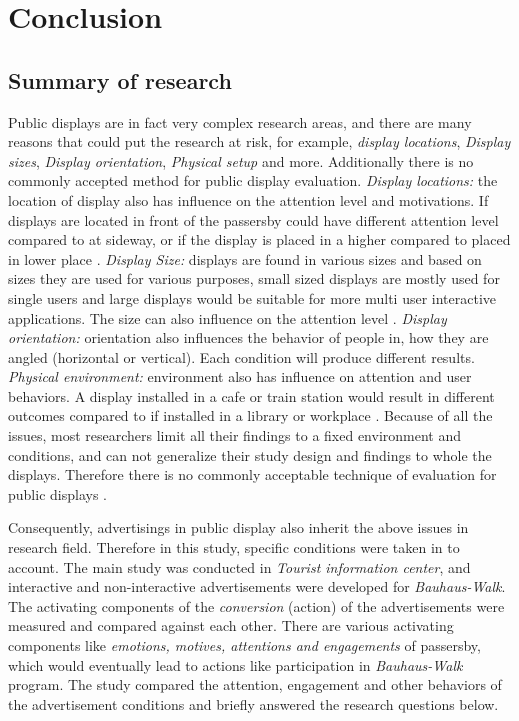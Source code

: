 \chapter{Conclusion} %

\label{Chapter10} %
\newpage

\section{Summary of research}

Public displays are in fact very complex research areas, and there are many reasons that could put the research at risk, for example, \emph{display locations}, \emph{Display sizes}, \emph{ Display orientation}, \emph{Physical setup} and more. Additionally there is no commonly accepted method for public display evaluation. \emph{Display locations:} the location of display also has influence on the attention level and motivations. If displays are located in front of the passersby could have different attention level compared to at sideway, or if the display is placed in a higher compared to placed in lower place \cite{WhenPublicDisplays}. \emph{Display Size:} displays are found in various sizes and based on sizes they are used for various purposes, small sized displays are mostly used for single users and large displays would be suitable for more multi user interactive applications. The size can also influence on the attention level \cite{WhenPublicDisplays}. \emph{Display orientation:} orientation also influences the behavior of people in, how they are angled (horizontal or vertical). Each condition will produce different results\cite{DisplayAngleEffect}. \emph{Physical environment:} environment also has influence on attention and user behaviors. A display installed in a cafe or train station\cite{multimediaworkplace} would result in different outcomes compared to if installed in a library or workplace \cite{multimediaworkplace, semidisplay }. Because of all the issues, most researchers limit all their findings to a fixed environment and conditions, and can not generalize their study design and findings to whole the displays.  Therefore there is no commonly acceptable technique of evaluation for public displays \cite{HowToEvaluate}.

Consequently, advertisings in public display also inherit the above issues in research field. Therefore in this study, specific conditions were taken in to account. The main study was conducted in \emph{Tourist information center}, and interactive and non-interactive advertisements were developed for \emph{Bauhaus-Walk}. The activating components of the \emph{conversion} (action) of the advertisements were measured and compared against each other. There are various activating components like \emph{emotions, motives, attentions and engagements} of passersby, which would eventually lead to actions like participation in \emph{Bauhaus-Walk} program. The study compared the attention, engagement and other behaviors of the advertisement conditions and briefly answered the research questions below.





